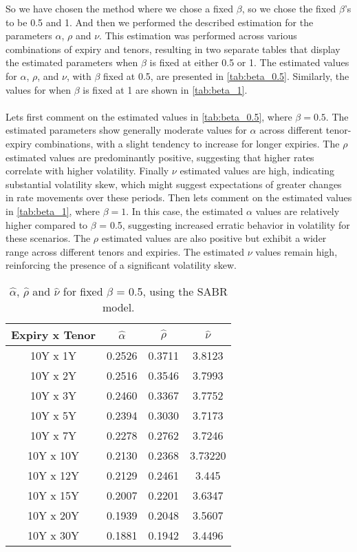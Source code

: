 \noindent
So we have chosen the method where we chose a fixed $\beta$, so we chose the fixed $\beta$'s to be 0.5 and 1.
And then we performed the described estimation for the parameters $\alpha$, $\rho$ and $\nu$. 
This estimation was performed across various combinations of expiry and tenors, 
resulting in two separate tables that display the estimated parameters when $\beta$ is fixed at either 0.5 or 1. 
The estimated values for $\alpha$, $\rho$, and $\nu$, with $\beta$ fixed at 0.5, are presented in \autoref{tab:beta_0.5}. 
Similarly, the values for when $\beta$ is fixed at 1 are shown in \autoref{tab:beta_1}.
\\\\
Lets first comment on the estimated values in  \autoref{tab:beta_0.5}, where $\beta=0.5$.
The estimated parameters show generally moderate values for $\alpha$ across different tenor-expiry combinations, 
with a slight tendency to increase for longer expiries. The $\rho$ estimated values are predominantly positive, 
suggesting that higher rates correlate with higher volatility. Finally $\nu$  estimated values are high, 
indicating substantial volatility skew, which might suggest expectations of greater changes in 
rate movements over these periods. Then lets comment on the estimated values in \autoref{tab:beta_1}, where $\beta=1$.
In this case, the estimated $\alpha$ values are relatively higher compared to $\beta$ = 0.5, suggesting increased erratic behavior in volatility 
for these scenarios. The $\rho$ estimated  values are also positive but exhibit a wider range across different tenors and expiries. 
The estimated $\nu$ values remain high, reinforcing the presence of a significant volatility skew.
\\
\begin{table}[H]
    \centering
    \begin{tabular}{cccc}
      \toprule
      \textbf{Expiry x Tenor } & \textbf{$\hat{\alpha}$} & \textbf{$\hat{\rho}$}  & \textbf{$\hat{\nu}$} \\
      \midrule
      \rowcolor{lightgray!40}  10Y x 1Y &0.2526 & 0.3711 & 3.8123 \\
      10Y x 2Y &0.2516 & 0.3546 & 3.7993 \\
      \rowcolor{lightgray!40}  10Y x 3Y  &0.2460 & 0.3367 & 3.7752 \\
      10Y x 5Y &0.2394 & 0.3030 & 3.7173 \\
      \rowcolor{lightgray!40} 10Y x 7Y &0.2278 & 0.2762 & 3.7246 \\
      10Y x 10Y &0.2130& 0.2368 & 3.73220 \\
      \rowcolor{lightgray!40}  10Y x 12Y &0.2129 & 0.2461& 3.445 \\
      10Y x 15Y &0.2007 & 0.2201 & 3.6347 \\
      \rowcolor{lightgray!40} 10Y x 20Y &0.1939 & 0.2048 & 3.5607 \\
      10Y x 30Y &0.1881 & 0.1942 & 3.4496 \\
      \bottomrule
    \end{tabular}
    \caption{$\hat{\alpha}$, $\hat{\rho}$ and $\hat{\nu}$ for fixed $\beta$ = 0.5, using the SABR model.}
    \label{tab:beta_0.5}
\end{table}
\noindent

